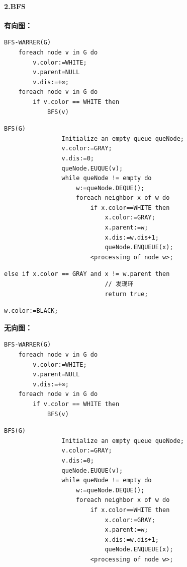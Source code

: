 \documentclass{article}
\begin{document}
\paragraph{2.BFS\\}
\textbf{有向图：\\}
\begin{lstlisting}[style=algorithmPPT]
    BFS-WARRER(G)
    foreach node v in G do
        v.color:=WHITE; 
        v.parent=NULL 
        v.dis:=+∞;
    foreach node v in G do
        if v.color == WHITE then
            BFS(v)
\end{lstlisting}

\begin{lstlisting}[style=algorithmPPT]
            BFS(G)
                Initialize an empty queue queNode;
                v.color:=GRAY;
                v.dis:=0;
                queNode.EUQUE(v);
                while queNode != empty do
                    w:=queNode.DEQUE();
                    foreach neighbor x of w do
                        if x.color==WHITE then
                            x.color:=GRAY;
                            x.parent:=w;
                            x.dis:=w.dis+1;
                            queNode.ENQUEUE(x);
                        <processing of node w>;
\end{lstlisting}
\begin{lstlisting}[style=algorithm]
                        else if x.color == GRAY and x != w.parent then
                            // 发现环
                            return true;
\end{lstlisting}
\begin{lstlisting}[style=algorithmPPT]
                        w.color:=BLACK;
\end{lstlisting}

\textbf{无向图：\\}
\begin{lstlisting}[style=algorithmPPT]
    BFS-WARRER(G)
    foreach node v in G do
        v.color:=WHITE; 
        v.parent=NULL 
        v.dis:=+∞;
    foreach node v in G do
        if v.color == WHITE then
            BFS(v)
\end{lstlisting}

\begin{lstlisting}[style=algorithmPPT]
            BFS(G)
                Initialize an empty queue queNode;
                v.color:=GRAY;
                v.dis:=0;
                queNode.EUQUE(v);
                while queNode != empty do
                    w:=queNode.DEQUE();
                    foreach neighbor x of w do
                        if x.color==WHITE then
                            x.color:=GRAY;
                            x.parent:=w;
                            x.dis:=w.dis+1;
                            queNode.ENQUEUE(x);
                        <processing of node w>;
                    \end{lstlisting}
\end{document}
